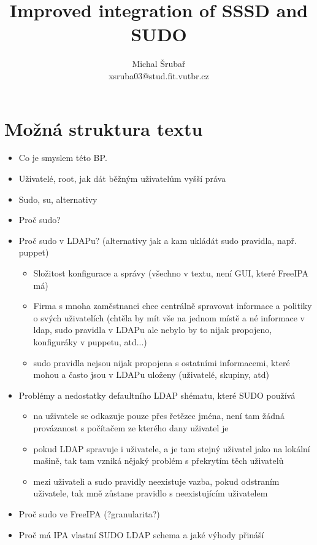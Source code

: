 \documentclass[10pt,a4paper,notitlepage]{article}
\author{Michal Šrubař\\xsruba03@stud.fit.vutbr.cz}
\date{}
\title{Improved integration of SSSD and SUDO}
\begin{document}
\maketitle

\section*{Možná struktura textu}
\begin{itemize}
	\item	Co je smyslem této BP.
	\item Uživatelé, root, jak dát běžným uživatelům vyšší práva
	\item Sudo, su, alternativy
	\item Proč sudo?
	\item	Proč sudo v LDAPu? (alternativy jak a kam ukládát sudo pravidla, např.
		puppet)

	\begin{itemize}
		\item Složitost konfigurace a správy (všechno v textu, není GUI, které FreeIPA má)
		\item Firma s mnoha zaměstnanci chce centrálně spravovat informace a
			politiky o svých uživatelích (chtěla by mít vše na jednom místě a né
			informace v ldap, sudo pravidla v LDAPu ale nebylo by to nijak propojeno,
			konfiguráky v puppetu, atd...)
		\item sudo pravidla nejsou nijak propojena s ostatními informacemi, které
			mohou a často jsou v LDAPu uloženy (uživatelé, skupiny, atd)
	\end{itemize}
	
	\item Problémy a nedostatky defaultního LDAP shématu, které SUDO používá
	\begin{itemize}
		\item na uživatele se odkazuje pouze přes řetězec jména, není tam žádná
			provázanost s počítačem ze kterého dany uživatel je
		\item pokud LDAP spravuje i uživatele, a je tam stejný uživatel jako na
			lokální mašině, tak tam vzniká nějaký problém s překrytím těch uživatelů
		\item mezi uživateli a sudo pravidly neexistuje vazba, pokud odstraním
			uživatele, tak mně zůstane pravidlo s neexistujícím uživatelem
	\end{itemize}
	\item Proč sudo ve FreeIPA (?granularita?)
	\item Proč má IPA vlastní SUDO LDAP schema a jaké výhody přináší


\end{itemize}
\end{document}
